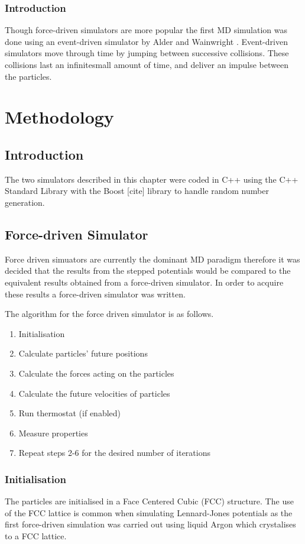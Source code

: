 \documentclass[12pt]{UoAthesis}
\begin{document}
\subsection{Introduction} 
Though force-driven simulators are more popular the first MD
simulation was done using an event-driven simulator by Alder and
Wainwright \cite{Alder1959}. Event-driven simulators move through time
by jumping between successive collisions. These collisions last an
infinitesmall amount of time, and deliver an impulse between the
particles.
\chapter{Methodology} 
\section{Introduction} 

The two simulators described in this chapter were coded in C++ using
the C++ Standard Library with the Boost [cite] library to handle
random number generation.

\section{Force-driven Simulator} 
Force driven simuators are currently the
dominant MD paradigm therefore it was decided that the results from
the stepped potentials would be compared to the equivalent results
obtained from a force-driven simulator. In order to acquire these
results a force-driven simulator was written.

The algorithm for the force driven simulator is as follows. 
\begin{flushleft}
  \begin{enumerate} 
  \item Initialisation 
  \item Calculate particles' future positions 
  \item Calculate the forces acting on the particles 
  \item Calculate the future velocities of particles 
  \item Run thermostat (if enabled) 
  \item Measure properties 
  \item Repeat steps 2-6 for the desired number of iterations
  \end{enumerate} 
\end{flushleft}

\subsection{Initialisation} The particles are initialised in a Face Centered
Cubic (FCC)  structure. The
use of the FCC lattice is common when simulating Lennard-Jones
potentials as the first force-driven simulation \cite{Rahman1964} was
carried out using liquid Argon which crystalises to a FCC lattice.
\end{document}
